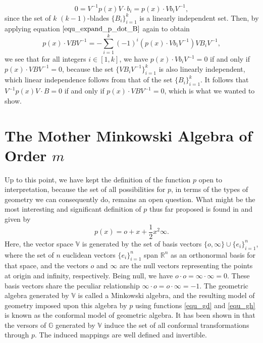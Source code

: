 \documentclass{ecgd-l}
\theoremstyle{definition}
\theoremstyle{remark}
\numberwithin{equation}{section}
\newcommand{\R}{\mathbb{R}}
\newcommand{\G}{\mathbb{G}}
\newcommand{\V}{\mathbb{V}}
\newcommand{\nvai}{\infty}
\newcommand{\nvao}{o}
\begin{document}
\begin{equation*}
0=V^{-1}p(x)V\cdot b_i=p(x)\cdot Vb_iV^{-1},
\end{equation*}
since the set of $k$ $(k-1)$-blades $\{B_i\}_{i=1}^k$ is a linearly
independent set.  Then, by applying equation $\eqref{equ_expand_p_dot_B}$ again
to obtain
\begin{equation*}
p(x)\cdot VBV^{-1} = -\sum_{i=1}^k(-1)^i(p(x)\cdot Vb_iV^{-1})VB_iV^{-1},
\end{equation*}
we see that
for all integers $i\in[1,k]$, we have $p(x)\cdot Vb_iV^{-1}=0$
if and only if $p(x)\cdot VBV^{-1}=0$, because the set $\{VB_iV^{-1}\}_{i=1}^k$ is
also linearly independent, which linear independence follows from that of the
set $\{B_i\}_{i=1}^k$.
It follows that $V^{-1}p(x)V\cdot B=0$ if and only if $p(x)\cdot VBV^{-1}=0$,
which is what we wanted to show.

\section{The Mother Minkowski Algebra of Order $m$}

Up to this point, we have kept the definition of the function $p$
open to interpretation, because the set of all possibilities for $p$, in terms of the types of geometry
we can consequently do, remains an open question.  What might be the most interesting and significant
definition of $p$ thus far proposed is found in \cite{Hestenes01} and given by
\begin{equation*}
p(x)=\nvao + x + \frac{1}{2}x^2\nvai.
\end{equation*}
Here, the vector space $\V$ is generated by the set
of basis vectors $\{\nvao,\nvai\}\cup\{e_i\}_{i=1}^n$,
where the set of $n$ euclidean vectors $\{e_i\}_{i=1}^n$ span
$\R^n$ as an orthonormal basis for that space, and the
vectors $\nvao$ and $\nvai$ are the null vectors representing the
points at origin and infinity, respectively.  Being null, we have $\nvao\cdot\nvao=\nvai\cdot\nvai=0$.
These basis vectors share the peculiar relationship $\nvai\cdot\nvao=\nvao\cdot\nvai=-1$.  The geometric
algebra generated by $\V$ is called a Minkowski algebra, and the resulting model of
geometry imposed upon this algebra by $p$ using functions \eqref{equ_gd} and \eqref{equ_gh}
is known as the conformal model of geometric algebra.  It has been shown in
\cite{Hestenes01,LiRockwood01,Dorst07} that
the versors of $\G$ generated by $\V$ induce the set of all conformal transformations through $p$.
The induced mappings are well defined and invertible.
\end{document}

